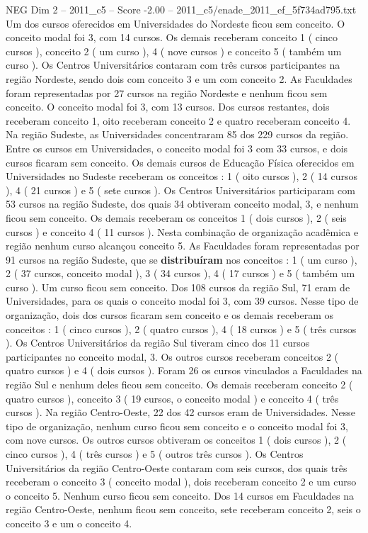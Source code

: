 \begin{textsample}{NEG Dim 2 – 2011\_c5 – Score -2.00 – 2011\_c5/enade\_2011\_ef\_5f734ad795.txt}
Um dos cursos oferecidos em Universidades do Nordeste ficou sem conceito.
O conceito modal foi 3, com 14 cursos.
Os demais receberam conceito 1 ( cinco cursos ), conceito 2 ( um curso ), 4 ( nove cursos ) e conceito 5 ( também um curso ).
Os Centros Universitários contaram com três cursos participantes na região Nordeste, sendo dois com conceito 3 e um com conceito 2.
As Faculdades foram representadas por 27 cursos na região Nordeste e nenhum ficou sem conceito.
O conceito modal foi 3, com 13 cursos.
Dos cursos restantes, dois receberam conceito 1, oito receberam conceito 2 e quatro receberam conceito 4.
Na região Sudeste, as Universidades concentraram 85 dos 229 cursos da região.
Entre os cursos em Universidades, o conceito modal foi 3 com 33 cursos, e dois cursos ficaram sem conceito.
Os demais cursos de Educação Física oferecidos em Universidades no Sudeste receberam os conceitos : 1 ( oito cursos ), 2 ( 14 cursos ), 4 ( 21 cursos ) e 5 ( sete cursos ).
Os Centros Universitários participaram com 53 cursos na região Sudeste, dos quais 34 obtiveram conceito modal, 3, e nenhum ficou sem conceito.
Os demais receberam os conceitos 1 ( dois cursos ), 2 ( seis cursos ) e conceito 4 ( 11 cursos ).
Nesta combinação de organização acadêmica e região nenhum curso alcançou conceito 5.
As Faculdades foram representadas por 91 cursos na região Sudeste, que se \textbf{distribuíram} nos conceitos : 1 ( um curso ), 2 ( 37 cursos, conceito modal ), 3 ( 34 cursos ), 4 ( 17 cursos ) e 5 ( também um curso ).
Um curso ficou sem conceito.
Dos 108 cursos da região Sul, 71 eram de Universidades, para os quais o conceito modal foi 3, com 39 cursos.
Nesse tipo de organização, dois dos cursos ficaram sem conceito e os demais receberam os conceitos : 1 ( cinco cursos ), 2 ( quatro cursos ), 4 ( 18 cursos ) e 5 ( três cursos ).
Os Centros Universitários da região Sul tiveram cinco dos 11 cursos participantes no conceito modal, 3.
Os outros cursos receberam conceitos 2 ( quatro cursos ) e 4 ( dois cursos ).
Foram 26 os cursos vinculados a Faculdades na região Sul e nenhum deles ficou sem conceito.
Os demais receberam conceito 2 ( quatro cursos ), conceito 3 ( 19 cursos, o conceito modal ) e conceito 4 ( três cursos ).
Na região Centro-Oeste, 22 dos 42 cursos eram de Universidades.
Nesse tipo de organização, nenhum curso ficou sem conceito e o conceito modal foi 3, com nove cursos.
Os outros cursos obtiveram os conceitos 1 ( dois cursos ), 2 ( cinco cursos ), 4 ( três cursos ) e 5 ( outros três cursos ).
Os Centros Universitários da região Centro-Oeste contaram com seis cursos, dos quais três receberam o conceito 3 ( conceito modal ), dois receberam conceito 2 e um curso o conceito 5.
Nenhum curso ficou sem conceito.
Dos 14 cursos em Faculdades na região Centro-Oeste, nenhum ficou sem conceito, sete receberam conceito 2, seis o conceito 3 e um o conceito 4.

\end{textsample}
